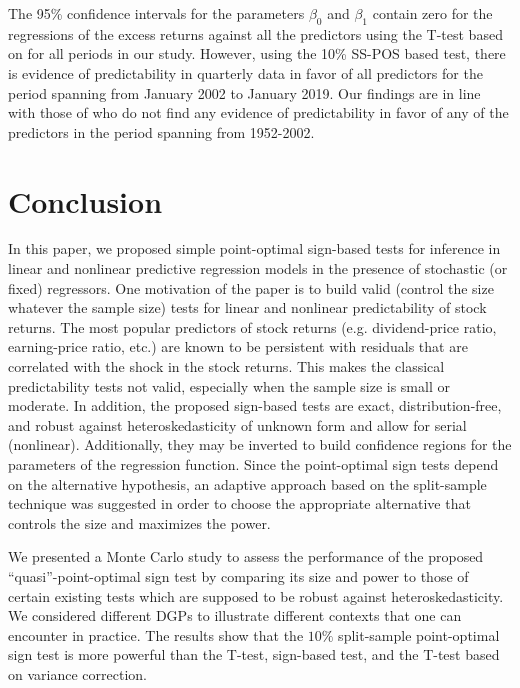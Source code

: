 \documentclass[harvard,11pt]{article}
\begin{document}
The 95\% confidence intervals for the parameters $\beta_0$ and $\beta_1$ contain zero for the regressions of the excess returns against all the predictors using the T-test based on \citet{white1980heteroskedasticity} for all periods in our study. However, using the 10\% SS-POS based test, there is evidence of predictability in quarterly data in favor of all predictors for the period spanning from January 2002 to January 2019. Our findings are in line with those of \citet{campbell2006efficient} who do not find any evidence of predictability in favor of any of the predictors in the period spanning from 1952-2002. 



\section{Conclusion \label{ConclusionC1}}

In this paper, we proposed simple point-optimal sign-based tests for inference in linear
and nonlinear predictive regression models in the presence of stochastic (or fixed) regressors.
One motivation of the paper is to build valid (control the size whatever the
sample size) tests for linear and nonlinear predictability of stock returns.
The most popular predictors of stock returns (e.g. dividend-price ratio,
earning-price ratio, etc.) are known to be persistent with residuals that are correlated with
the shock in the stock returns. This makes the classical predictability tests
not valid, especially when the sample size is small or moderate. In
addition, the proposed sign-based tests are exact, distribution-free, and
robust against heteroskedasticity of unknown form and allow for serial (nonlinear). Additionally, they may be inverted to build
confidence regions for the parameters of the regression function. Since the
point-optimal sign tests depend on the alternative hypothesis, an adaptive
approach based on the split-sample technique was suggested in order to choose
the appropriate alternative that controls the size and maximizes the power.

We presented a Monte Carlo study to assess the performance of the proposed
\textquotedblleft quasi\textquotedblright -point-optimal sign test by
comparing its size and power to those of certain existing tests which are
supposed to be robust against heteroskedasticity. We considered different
DGPs to illustrate different contexts that one can encounter in practice.
The results show that the $10\%$ split-sample point-optimal sign test is
more powerful than the T-test, \citet{dufour1995exact} sign-based test,
and the T-test based on \citet{white1980heteroskedasticity} variance correction.
\end{document}
